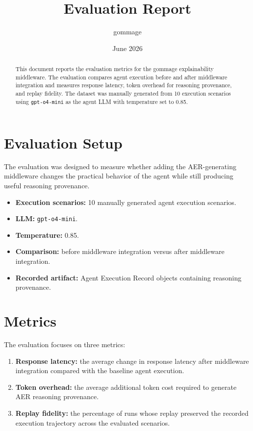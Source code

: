 \documentclass[11pt,a4paper]{article}
\title{\textbf{Evaluation Report}}
\author{gommage}
\date{June 2026}
\begin{document}
\maketitle

\begin{abstract}
This document reports the evaluation metrics for the gommage explainability
middleware. The evaluation compares agent execution before and after middleware
integration and measures response latency, token overhead for reasoning
provenance, and replay fidelity. The dataset was manually generated from 10
execution scenarios using \texttt{gpt-o4-mini} as the agent LLM with temperature
set to 0.85.
\end{abstract}

\section{Evaluation Setup}

The evaluation was designed to measure whether adding the AER-generating
middleware changes the practical behavior of the agent while still producing
useful reasoning provenance.

\begin{itemize}[leftmargin=1.5em]
  \item \textbf{Execution scenarios:} 10 manually generated agent execution scenarios.
  \item \textbf{LLM:} \texttt{gpt-o4-mini}.
  \item \textbf{Temperature:} 0.85.
  \item \textbf{Comparison:} before middleware integration versus after middleware integration.
  \item \textbf{Recorded artifact:} Agent Execution Record objects containing reasoning provenance.
\end{itemize}

\section{Metrics}

The evaluation focuses on three metrics:

\begin{enumerate}[leftmargin=1.5em]
  \item \textbf{Response latency:} the average change in response latency after
  middleware integration compared with the baseline agent execution.
  \item \textbf{Token overhead:} the average additional token cost required to
  generate AER reasoning provenance.
  \item \textbf{Replay fidelity:} the percentage of runs whose replay preserved
  the recorded execution trajectory across the evaluated scenarios.
\end{enumerate}
\end{document}
